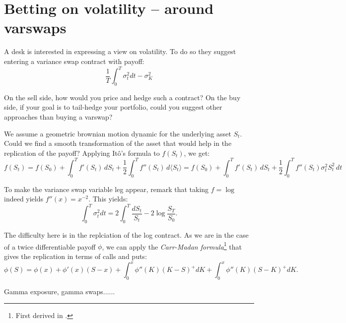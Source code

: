 \section{Betting on volatility -- around varswaps}

\begin{tcolorbox}[width=\linewidth, sharp corners=all, colback=white!95!black]
    A desk is interested in expressing a view on volatility. To do so they suggest entering a variance swap contract with payoff:
    \[\dfrac{1}{T} \int_{0}^{T} \sigma_t^2 dt - \sigma_K^2\]

    On the sell side, how would you price and hedge such a contract?\newline
    On the buy side, if your goal is to tail-hedge your portfolio, could you suggest other approaches than buying a varswap?

\end{tcolorbox}

We assume a geometric brownian motion dynamic for the underlying asset $S_t$. Could we find a smooth transformation of the asset that would help in the replication of the payoff? Applying Itô's formula to $f(S_t)$, we get:
\[
f(S_t) = f(S_0) + \int_0^T f'(S_t) \,dS_t + \dfrac{1}{2} \int_0^T f''(S_t) \,d\langle S_t\rangle = f(S_0) + \int_0^T f'(S_t) \,dS_t + \dfrac{1}{2} \int_0^T f''(S_t) \sigma_t^2 S_t^2 \,dt
\]

To make the variance swap variable leg appear, remark that taking $f = \log$ indeed yields $f''(x) = x^{-2}$.
This yields:
\[
    \int_{0}^{T} \sigma_t^2 dt = 2 \int_0^T \dfrac{dS_t}{S_t} - 2 \log \dfrac{S_T}{S_0}.
\]

The difficulty here is in the replciation of the log contract. As we are in the case of a twice differentiable payoff $\phi$, we can apply the \textit{Carr-Madan formula}\footnote{First derived in .} that gives the replication in terms of calls and puts:
\begin{equation}\label{eqn:carr-madan}
    \phi(S) = \phi(x) + \phi'(x)(S-x) + \int_0^x \phi''(K)(K-S)^{+} dK + \int_0^x \phi''(K)(S-K)^{+} dK.
\end{equation}

Gamma exposure, gamma swaps......

